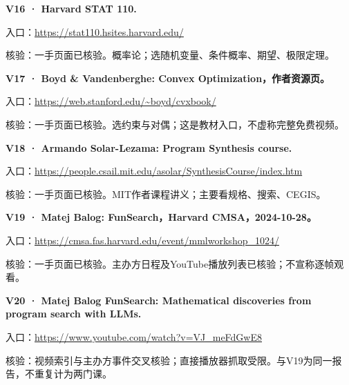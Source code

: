 \par\noindent\begin{minipage}{\linewidth}
\textbf{V16 · Harvard STAT 110.}

入口：\url{https://stat110.hsites.harvard.edu/}

核验：一手页面已核验。概率论；选随机变量、条件概率、期望、极限定理。
\end{minipage}\par\vspace{6pt}

\par\noindent\begin{minipage}{\linewidth}
\textbf{V17 · Boyd \& Vandenberghe: Convex Optimization，作者资源页。}

入口：\url{https://web.stanford.edu/~boyd/cvxbook/}

核验：一手页面已核验。选约束与对偶；这是教材入口，不虚称完整免费视频。
\end{minipage}\par\vspace{6pt}

\par\noindent\begin{minipage}{\linewidth}
\textbf{V18 · Armando Solar-Lezama: Program Synthesis course.}

入口：\url{https://people.csail.mit.edu/asolar/SynthesisCourse/index.htm}

核验：一手页面已核验。MIT作者课程讲义；主要看规格、搜索、CEGIS。
\end{minipage}\par\vspace{6pt}

\par\noindent\begin{minipage}{\linewidth}
\textbf{V19 · Matej Balog: FunSearch，Harvard CMSA，2024-10-28。}

入口：\url{https://cmsa.fas.harvard.edu/event/mmlworkshop_1024/}

核验：一手页面已核验。主办方日程及YouTube播放列表已核验；不宣称逐帧观看。
\end{minipage}\par\vspace{6pt}

\par\noindent\begin{minipage}{\linewidth}
\textbf{V20 · Matej Balog \textbar{} FunSearch: Mathematical discoveries
from program search with LLMs.}

入口：\url{https://www.youtube.com/watch?v=VJ_meFdGwE8}

核验：视频索引与主办方事件交叉核验；直接播放器抓取受限。与V19为同一报告，不重复计为两门课。
\end{minipage}\par\vspace{6pt}

